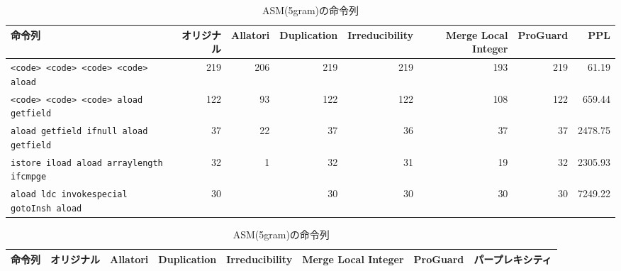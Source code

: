 \documentclass[a4j,fleqn,10pt]{jarticle}
\begin{document}
\begin{table}[t]
  \centering
  \footnotesize{
    \caption{ASM(5gram)の命令列}\label{table:asm}
  \begin{tabular}{lrrrrrrr}
    命令列 &
    \multicolumn{1}{p{1cm}}{オリジナル} & 
    \multicolumn{1}{p{1cm}}{Allatori} & 
    \multicolumn{1}{p{1cm}}{Duplication} & 
    \multicolumn{1}{p{1cm}}{Irreducibility} & 
    \multicolumn{1}{p{1cm}}{Merge Local Integer} & 
    \multicolumn{1}{p{1cm}}{ProGuard} & 
    \multicolumn{1}{p{1cm}}{PPL} \\ \hline
    \texttt{<code> <code> <code> <code> aload}      & 219 & 206 & 219 & 219 & 193 & 219 & 61.19 \\
    \texttt{<code> <code> <code> aload getfield}    & 122 &  93 & 122 & 122 & 108 & 122 & 659.44 \\
    \texttt{aload getfield ifnull aload getfield}   & 37  &  22 &  37 &  36 &  37 &  37 & 2478.75 \\
    \texttt{istore iload aload arraylength ifcmpge} & 32  &   1 &  32 &  31 &  19 &  32 & 2305.93 \\
    \texttt{aload ldc invokespecial gotoInsh aload} & 30  &     &  30 &  30 &  30 &  30 & 7249.22 \\
  \end{tabular}
  \begin{tabular}{lrrrrrrr}
    命令列 &
    \multicolumn{1}{p{1cm}}{オリジナル} & 
    \multicolumn{1}{p{1cm}}{Allatori} & 
    \multicolumn{1}{p{1cm}}{Duplication} & 
    \multicolumn{1}{p{1cm}}{Irreducibility} & 
    \multicolumn{1}{p{1cm}}{Merge Local Integer} & 
    \multicolumn{1}{p{1cm}}{ProGuard} & 
    \multicolumn{1}{p{1cm}}{パープレキシティ} \\ \hline

\end{tabular}}
\end{table}
\end{document}
